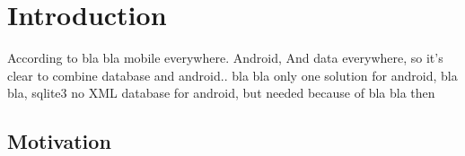 \chapter{Introduction}
\label{cha:introduction}
According to bla bla mobile everywhere. Android, And data everywhere, so it's clear to combine database and android.. bla bla
only one solution for android, bla bla, sqlite3
no XML database for android, but needed because of bla bla
then 

\section{Motivation}
\label{sec:introduction:motivation}
